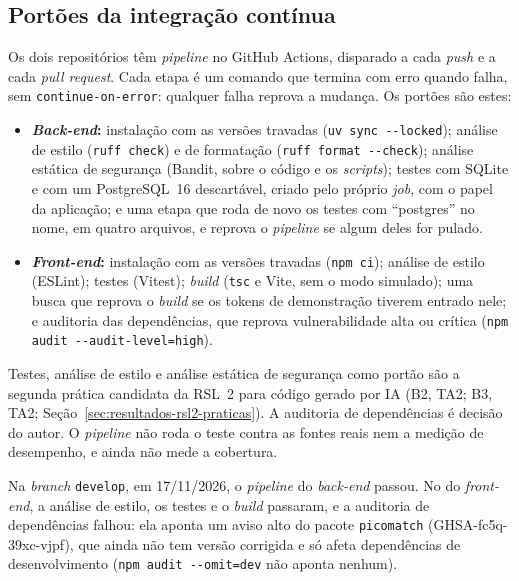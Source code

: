 \subsection{Portões da integração contínua}
\label{sec:desenv-testes-ci}

Os dois repositórios têm \textit{pipeline} no GitHub Actions, disparado a
cada \textit{push} e a cada \textit{pull request}. Cada etapa é um comando
que termina com erro quando falha, sem \texttt{continue-on-error}: qualquer
falha reprova a mudança. Os portões são estes:
\begin{itemize}
	\item \textbf{\textit{Back-end}:} instalação com as versões travadas
	(\texttt{uv sync -{}-locked}); análise de estilo (\texttt{ruff check}) e
	de formatação (\texttt{ruff format -{}-check}); análise estática de
	segurança (Bandit, sobre o código e os \textit{scripts}); testes com
	SQLite e com um PostgreSQL~16 descartável, criado pelo próprio
	\textit{job}, com o papel da aplicação; e uma etapa que roda de novo os
	testes com ``postgres'' no nome, em quatro arquivos, e reprova o
	\textit{pipeline} se algum deles for pulado.
	\item \textbf{\textit{Front-end}:} instalação com as versões travadas
	(\texttt{npm ci}); análise de estilo (ESLint); testes (Vitest);
	\textit{build} (\texttt{tsc} e Vite, sem o modo simulado); uma busca que
	reprova o \textit{build} se os tokens de demonstração tiverem entrado nele;
	e auditoria das dependências, que reprova vulnerabilidade alta ou crítica
	(\texttt{npm audit -{}-audit-level=high}).
\end{itemize}
Testes, análise de estilo e análise estática de segurança como portão são a
segunda prática candidata da RSL~2 para código gerado por IA (B2, TA2; B3,
TA2; Seção~\ref{sec:resultados-rsl2-praticas}). A auditoria de dependências
é decisão do autor. O \textit{pipeline} não roda
o teste contra as fontes reais nem a medição de desempenho, e ainda não mede
a cobertura.

Na \textit{branch} \texttt{develop}, em 17/11/2026, o \textit{pipeline} do
\textit{back-end} passou. No do \textit{front-end}, a análise de estilo, os
testes e o \textit{build} passaram, e a auditoria de dependências falhou: ela
aponta um aviso alto do pacote \texttt{picomatch} (GHSA-fc5q-39xc-vjpf), que
ainda não tem versão corrigida e só afeta dependências de desenvolvimento
(\texttt{npm audit -{}-omit=dev} não aponta nenhum).

